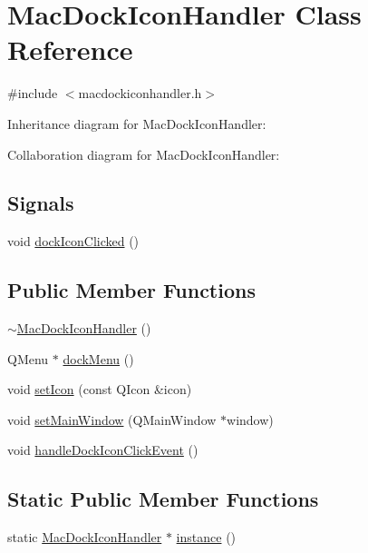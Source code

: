 \hypertarget{class_mac_dock_icon_handler}{}\section{Mac\+Dock\+Icon\+Handler Class Reference}
\label{class_mac_dock_icon_handler}


{\ttfamily \#include $<$macdockiconhandler.\+h$>$}



Inheritance diagram for Mac\+Dock\+Icon\+Handler\+:


Collaboration diagram for Mac\+Dock\+Icon\+Handler\+:
\subsection*{Signals}
\begin{DoxyCompactItemize}
\item 
void \hyperlink{class_mac_dock_icon_handler_ae75bf0cda7a9c1a8fbc24af59b9f0e0f}{dock\+Icon\+Clicked} ()
\end{DoxyCompactItemize}
\subsection*{Public Member Functions}
\begin{DoxyCompactItemize}
\item 
\hyperlink{class_mac_dock_icon_handler_a1253fb7e351af70d8fcf863a8833066c}{$\sim$\+Mac\+Dock\+Icon\+Handler} ()
\item 
Q\+Menu $\ast$ \hyperlink{class_mac_dock_icon_handler_a8aff3dc6410687e432f8d9314eba0ab9}{dock\+Menu} ()
\item 
void \hyperlink{class_mac_dock_icon_handler_a537f8eb3c9752089e3e2e0e30011a65b}{set\+Icon} (const Q\+Icon \&icon)
\item 
void \hyperlink{class_mac_dock_icon_handler_a4d2d18c7d56286ea745e349497941293}{set\+Main\+Window} (Q\+Main\+Window $\ast$window)
\item 
void \hyperlink{class_mac_dock_icon_handler_a38f422d9dde7df4ccfdda97b08467e0a}{handle\+Dock\+Icon\+Click\+Event} ()
\end{DoxyCompactItemize}
\subsection*{Static Public Member Functions}
\begin{DoxyCompactItemize}
\item 
static \hyperlink{class_mac_dock_icon_handler}{Mac\+Dock\+Icon\+Handler} $\ast$ \hyperlink{class_mac_dock_icon_handler_afd3ef7126d0b6ef02eaf85e5455fe6f4}{instance} ()
\end{DoxyCompactItemize}


